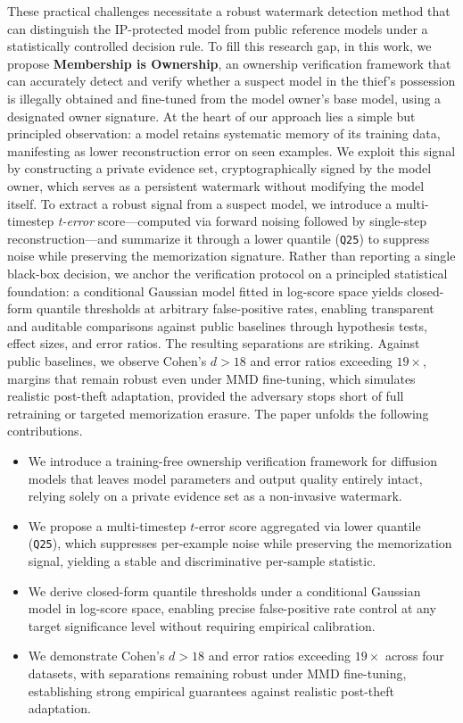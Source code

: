 \documentclass{article}
\begin{document}
These practical challenges necessitate a robust watermark detection method that can distinguish the IP-protected model from public reference models under a statistically controlled decision rule.
To fill this research gap, in this work, we propose \textbf{Membership is Ownership}, an ownership verification framework that can accurately detect and verify whether a suspect model in the thief's possession is illegally obtained and fine-tuned from the model owner's base model, using a designated owner signature.
At the heart of our approach lies a simple but principled observation: a model retains systematic memory of its training data, manifesting as lower reconstruction error on seen examples. We exploit this signal by constructing a private evidence set, cryptographically signed by the model owner, which serves as a persistent watermark without modifying the model itself.
To extract a robust signal from a suspect model, we introduce a multi-timestep \emph{t-error} score—computed via forward noising followed by single-step reconstruction—and summarize it through a lower quantile (\texttt{Q25}) to suppress noise while preserving the memorization signature. Rather than reporting a single black-box decision, we anchor the verification protocol on a principled statistical foundation: a conditional Gaussian model fitted in log-score space yields closed-form quantile thresholds at arbitrary false-positive rates, enabling transparent and auditable comparisons against public baselines through hypothesis tests, effect sizes, and error ratios.
The resulting separations are striking. Against public baselines, we observe Cohen's $d > 18$ and error ratios exceeding $19\times$, margins that remain robust even under MMD fine-tuning, which simulates realistic post-theft adaptation, provided the adversary stops short of full retraining or targeted memorization erasure.
The paper unfolds the following contributions.
\begin{itemize}
    \item We introduce a training-free ownership verification framework 
    for diffusion models that leaves model parameters and output 
    quality entirely intact, relying solely on a private evidence 
    set as a non-invasive watermark.

    \item We propose a multi-timestep $t$-error score aggregated via 
    lower quantile (\texttt{Q25}), which suppresses per-example noise 
    while preserving the memorization signal, yielding a stable and 
    discriminative per-sample statistic.

    \item We derive closed-form quantile thresholds under a conditional 
    Gaussian model in log-score space, enabling precise false-positive 
    rate control at any target significance level without requiring 
    empirical calibration.

    \item We demonstrate Cohen's $d > 18$ and error ratios exceeding 
    $19\times$ across four datasets, with separations remaining robust 
    under MMD fine-tuning, establishing strong empirical guarantees 
    against realistic post-theft adaptation.
\end{itemize}
\end{document}
